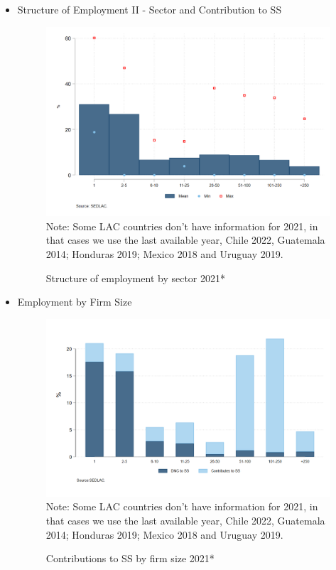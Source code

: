 \documentclass[english]{article}
\begin{document}
\begin{itemize}
\begin{itemize}
        
    \end{itemize}
\item Structure of Employment II - Sector and Contribution to SS
 \begin{itemize}
\begin{figure}[!htb]
        \centering
        \caption{Structure of employment by sector 2021*}     
        \includegraphics[scale=.3]{latex/figures/Snapshot/Structure of employment and sector.png}
        \label{fig:sector}
        \footnotesize{Note: Some LAC countries don’t have information for 2021, in that cases we use the last available year, Chile 2022, Guatemala 2014; Honduras 2019; Mexico 2018 and Uruguay 2019.}
\end{figure}
\end{itemize}
        
\item Employment by Firm Size
\begin{figure}[!htb]
        \centering
        \caption{Contributions to SS by firm size 2021*}     
        \includegraphics[scale=.3]{latex/figures/Snapshot/Contributions to SS by firmsize.png}
        \label{fig:Contributions to SS by firmsize}
        \footnotesize{Note: Some LAC countries don’t have information for 2021, in that cases we use the last available year, Chile 2022, Guatemala 2014; Honduras 2019; Mexico 2018 and Uruguay 2019.}
        \end{figure}
        

\end{itemize}
\end{document}
